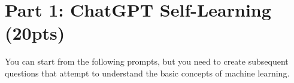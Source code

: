 \section{Part 1: ChatGPT Self-Learning (20pts)}

You can start from the following prompts, but you need to create subsequent questions that attempt to understand the basic concepts of machine learning.

